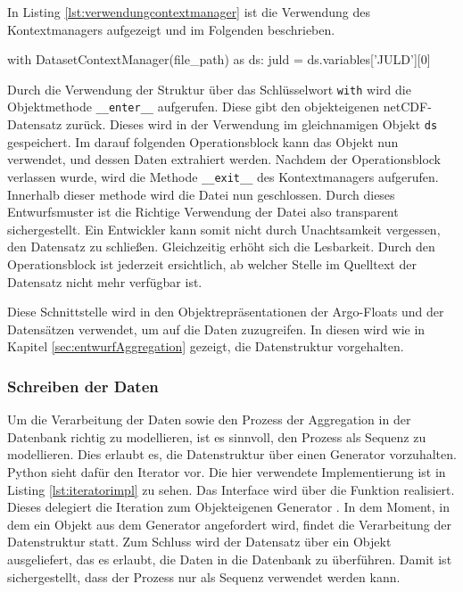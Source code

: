 In Listing \ref{lst:verwendungcontextmanager} ist die Verwendung des Kontextmanagers aufgezeigt und im Folgenden beschrieben.

\begin{python}[%
caption={Die Verwendung des Kontextmanagers},%
label={lst:verwendungcontextmanager}]
with DatasetContextManager(file_path) as ds:
    juld = ds.variables['JULD'][0]
\end{python}


Durch die Verwendung der Struktur über das Schlüsselwort \texttt{with} wird die Objektmethode \texttt{\_\_enter\_\_} aufgerufen. Diese gibt den objekteigenen netCDF-Datensatz zurück. Dieses wird in der Verwendung im gleichnamigen Objekt \texttt{ds} gespeichert. Im darauf folgenden Operationsblock kann das Objekt nun verwendet, und dessen Daten extrahiert werden. Nachdem der Operationsblock verlassen wurde, wird die Methode \texttt{\_\_exit\_\_} des Kontextmanagers aufgerufen. Innerhalb dieser methode wird die Datei nun geschlossen.  Durch dieses Entwurfsmuster ist die Richtige Verwendung der Datei also transparent sichergestellt. Ein Entwickler kann somit nicht durch Unachtsamkeit vergessen, den Datensatz zu schließen. Gleichzeitig erhöht sich die Lesbarkeit. Durch den Operationsblock ist jederzeit ersichtlich, ab welcher Stelle im Quelltext der Datensatz nicht mehr verfügbar ist. 

Diese Schnittstelle wird in den Objektrepräsentationen der Argo-Floats und der Datensätzen verwendet, um auf die Daten zuzugreifen. In diesen wird wie in Kapitel \ref{sec:entwurfAggregation} gezeigt, die Datenstruktur vorgehalten. 


\subsubsection{Schreiben der Daten}

Um die Verarbeitung der Daten sowie den Prozess der Aggregation in der Datenbank richtig zu modellieren, ist es sinnvoll, den Prozess als Sequenz zu modellieren. Dies erlaubt es, die Datenstruktur über einen Generator vorzuhalten. Python sieht dafür den Iterator vor.
Die hier verwendete Implementierung ist in Listing \ref{lst:iteratorimpl} zu sehen. Das Interface wird über die Funktion  realisiert. 
Dieses delegiert die Iteration zum Objekteigenen Generator . In dem Moment, in dem ein Objekt aus dem Generator angefordert wird, findet die Verarbeitung der Datenstruktur statt.
Zum Schluss wird der Datensatz über ein Objekt ausgeliefert, das es erlaubt, die Daten in die Datenbank zu überführen.
Damit ist sichergestellt, dass der Prozess nur als Sequenz verwendet werden kann.

